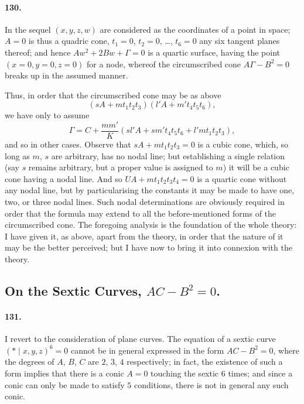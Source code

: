 \documentclass[11pt,a4paper]{article}
\begin{document}
\paragraph{130.}
In the sequel $(x, y, z, w)$ are considered as the coordinates of a point
in space; $A = 0$ is thus a quadric cone, $t_1 = 0$, $t_2 = 0$, \dots,
$t_6 = 0$ any six tangent planes thereof; and hence $A w^2 + 2 B w + \Gamma = 0$
is a quartic surface, having the point $(x = 0, y = 0, z = 0)$ for a node,
whereof the circumscribed cone $A\Gamma - B^2 = 0$ breaks up in the
assumed manner.

Thus, in order that the circumscribed cone may be as above
\[
(sA + m t_1 t_2 t_3)(l'A + m' t_4 t_5 t_6),
\]
we have only to assume
\[
\Gamma = C + \frac{m m'}{K}(s l'A + s m' t_4 t_5 t_6 + l' m t_1 t_2 t_3),
\]
and so in other cases. Observe that $sA + m t_1 t_2 t_3 = 0$ is a cubic
cone, which, so long as $m$, $s$ are arbitrary, has no nodal line; but
establishing a single relation (say $s$ remains arbitrary, but a proper
value is assigned to $m$) it will be a cubic cone having a nodal line.
And so $UA + m t_1 t_2 t_3 t_4 = 0$ is a quartic cone without any nodal
line, but by particularising the constants it may be made to have one,
two, or three nodal lines. Such nodal determinations are obviously
required in order that the formula may extend to all the before-mentioned
forms of the circumscribed cone. The foregoing analysis is the foundation
of the whole theory: I have given it, as above, apart from the theory, in
order that the nature of it may be the better perceived; but I have now
to bring it into connexion with the theory.

\subsection*{On the Sextic Curves, $AC - B^2 = 0$.}

\paragraph{131.}
I revert to the consideration of plane curves. The equation of a sextic
curve $(*\!\mid\! x, y, z)^6 = 0$ cannot be in general expressed in the
form $AC - B^2 = 0$, where the degrees of $A$, $B$, $C$ are $2$, $3$, $4$
respectively; in fact, the existence of such a form implies that there is
a conic $A = 0$ touching the sextic $6$ times; and since a conic can only
be made to satisfy $5$ conditions, there is not in general any such conic.
\end{document}
